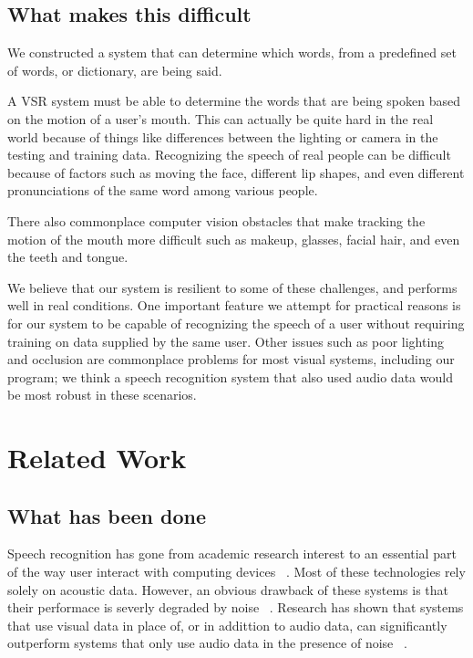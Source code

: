 \documentclass[10pt,twocolumn,letterpaper]{article}
\begin{document}
\subsection{What makes this difficult}
We constructed a system that can determine which words, from a predefined set of words, or dictionary, are being said.

A VSR system must be able to determine the words that are being spoken based on the motion of a user's mouth. This can actually be quite hard in the real world because of things like differences between the lighting or camera in the testing and training data. Recognizing the speech of real people can be difficult because of factors such as moving the face, different lip shapes, and even different pronunciations of the same word among various people.

There also commonplace computer vision obstacles that make tracking the motion of the mouth more difficult such as makeup, glasses, facial hair, and even the teeth and tongue.

We believe that our system is resilient to some of these challenges, and performs well in real conditions. One important feature we attempt for practical reasons is for our system to be capable of recognizing the speech of a user without requiring training on data supplied by the same user. Other issues such as poor lighting and occlusion are commonplace problems for most visual systems, including our program; we think a speech recognition system that also used audio data would be most robust in these scenarios.



\section{Related Work}
\subsection{What has been done}
Speech recognition has gone from academic research interest to an essential part of the way user interact with computing devices ~\cite{Lison:2014:SDS:2677339.2659891}.
Most of these technologies rely solely on acoustic data. However, an obvious drawback of these systems is that their performace is severly degraded by noise ~\cite{Cooke2001267}. Research has shown that systems that use visual data in place of, or in addittion to audio data, can significantly outperform systems that only use audio data in the presence of noise ~\cite{Lison:2014:SDS:2677339.2659891}.
\end{document}
